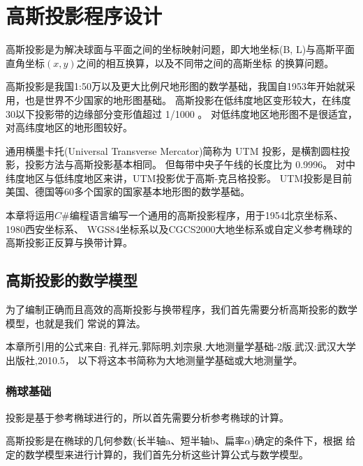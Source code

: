 
\chapter{高斯投影程序设计}

高斯投影是为解决球面与平面之间的坐标映射问题，即大地坐标(B,
L)与高斯平面直角坐标$(x,y)$之间的相互换算，以及不同带之间的高斯坐标
的换算问题。

高斯投影是我国1:50万以及更大比例尺地形图的数学基础，我国自1953年开始就采用，也是世界不少国家的地形图基础。
高斯投影在低纬度地区变形较大，在纬度30以下投影带的边缘部分变形值超过 1/1000 。
对低纬度地区地形图不是很适宜，对高纬度地区的地形图较好。

通用横墨卡托(Universal Transverse Mercator)简称为 UTM 投影，是横割圆柱投影，投影方法与高斯投影基本相同。
但每带中央子午线的长度比为 0.9996。
对中纬度地区与低纬度地区来讲，UTM投影优于高斯-克吕格投影。
UTM投影是目前美国、德国等60多个国家的国家基本地形图的数学基础。

本章将运用$C\#$编程语言编写一个通用的高斯投影程序，用于1954北京坐标系、1980西安坐标系、
WGS84坐标系以及CGCS2000大地坐标系或自定义参考椭球的高斯投影正反算与换带计算。


\section{高斯投影的数学模型}

为了编制正确而且高效的高斯投影与换带程序，我们首先需要分析高斯投影的数学模型，也就是我们
常说的算法。

本章所引用的公式来自:
孔祥元,郭际明,刘宗泉.大地测量学基础-2版.武汉:武汉大学出版社,2010.5，
以下将这本书简称为大地测量学基础或大地测量学。

\subsection{椭球基础}
投影是基于参考椭球进行的，所以首先需要分析参考椭球的计算。

高斯投影是在椭球的几何参数(长半轴a、短半轴b、扁率$\alpha$)确定的条件下，根据
给定的数学模型来进行计算的，我们首先分析这些计算公式与数学模型。

